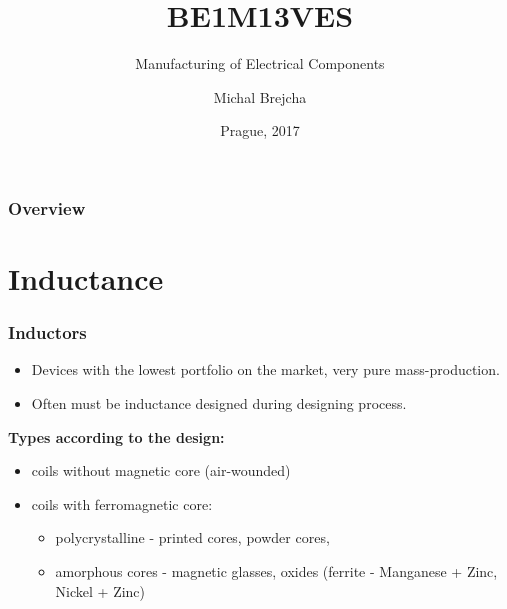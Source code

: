\documentclass{beamer}
\title[BE1M13VES]{BE1M13VES}
\subtitle[Manufacturing of Electrical Components] {Manufacturing of Electrical Components}
\author[Brejcha]{Michal Brejcha}
\institute[CTU]{CTU in Prague}
\date[Prague, 2017]{Prague, 2017}
\begin{document}
\frame{\titlepage}

\begin{frame}
\frametitle{Overview} 
\tableofcontents
\end{frame}


\section{\texorpdfstring{Inductance}{Inductance}}
	\begin{frame}
    \frametitle{Inductors}
		
		\begin{itemize}
			\item Devices with the lowest portfolio on the market, very pure mass-production. 
			\item Often must be inductance designed  during designing process.
		\end{itemize}
		\textbf{Types according to the design:}
		
		\begin{itemize}
			\item coils without magnetic core (air-wounded)
			\item coils with ferromagnetic core:
			\begin{itemize}
				\item polycrystalline - printed cores, powder cores,
				\item amorphous cores - magnetic glasses, oxides (ferrite - Manganese + Zinc, Nickel + Zinc)
			\end{itemize}
		\end{itemize}
  \end{frame}
\end{document}
